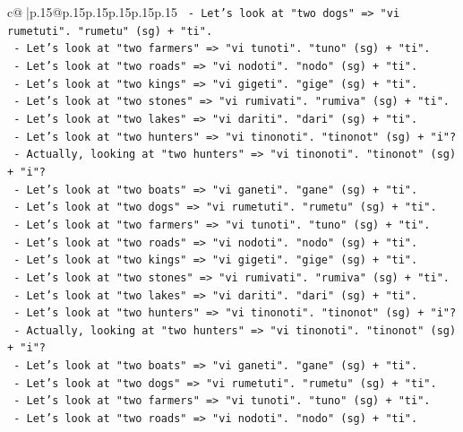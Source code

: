 \documentclass{article}
\begin{document}
{\begin{supertabular}{c@{$\;$}|p{.15\linewidth}@{}p{.15\linewidth}p{.15\linewidth}p{.15\linewidth}p{.15\linewidth}p{.15\linewidth}}
{{{\texttt{    {-} Let's look at "two dogs" => "vi rumetuti". "rumetu" (sg) + "ti".} \\
\texttt{    {-} Let's look at "two farmers" => "vi tunoti". "tuno" (sg) + "ti".} \\
\texttt{    {-} Let's look at "two roads" => "vi nodoti". "nodo" (sg) + "ti".} \\
\texttt{    {-} Let's look at "two kings" => "vi gigeti". "gige" (sg) + "ti".} \\
\texttt{    {-} Let's look at "two stones" => "vi rumivati". "rumiva" (sg) + "ti".} \\
\texttt{    {-} Let's look at "two lakes" => "vi dariti". "dari" (sg) + "ti".} \\
\texttt{    {-} Let's look at "two hunters" => "vi tinonoti". "tinonot" (sg) + "i"?} \\
\texttt{    {-} Actually, looking at "two hunters" => "vi tinonoti". "tinonot" (sg) + "i"?} \\
\texttt{    {-} Let's look at "two boats" => "vi ganeti". "gane" (sg) + "ti".} \\
\texttt{    {-} Let's look at "two dogs" => "vi rumetuti". "rumetu" (sg) + "ti".} \\
\texttt{    {-} Let's look at "two farmers" => "vi tunoti". "tuno" (sg) + "ti".} \\
\texttt{    {-} Let's look at "two roads" => "vi nodoti". "nodo" (sg) + "ti".} \\
\texttt{    {-} Let's look at "two kings" => "vi gigeti". "gige" (sg) + "ti".} \\
\texttt{    {-} Let's look at "two stones" => "vi rumivati". "rumiva" (sg) + "ti".} \\
\texttt{    {-} Let's look at "two lakes" => "vi dariti". "dari" (sg) + "ti".} \\
\texttt{    {-} Let's look at "two hunters" => "vi tinonoti". "tinonot" (sg) + "i"?} \\
\texttt{    {-} Actually, looking at "two hunters" => "vi tinonoti". "tinonot" (sg) + "i"?} \\
\texttt{    {-} Let's look at "two boats" => "vi ganeti". "gane" (sg) + "ti".} \\
\texttt{    {-} Let's look at "two dogs" => "vi rumetuti". "rumetu" (sg) + "ti".} \\
\texttt{    {-} Let's look at "two farmers" => "vi tunoti". "tuno" (sg) + "ti".} \\
\texttt{    {-} Let's look at "two roads" => "vi nodoti". "nodo" (sg) + "ti".} \\
}}}
\end{supertabular}}
\end{document}
